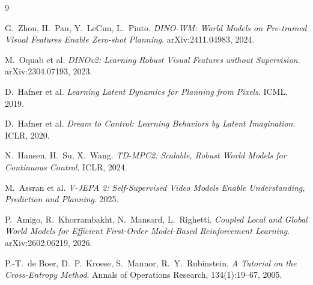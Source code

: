 \documentclass[11pt,a4paper]{article}
\begin{document}
\begin{thebibliography}{9}
\setlength{\itemsep}{2pt}

G.~Zhou, H.~Pan, Y.~LeCun, L.~Pinto.
\emph{DINO-WM: World Models on Pre-trained Visual Features Enable Zero-shot
Planning}. arXiv:2411.04983, 2024.

M.~Oquab et al.
\emph{DINOv2: Learning Robust Visual Features without Supervision}.
arXiv:2304.07193, 2023.

D.~Hafner et al.
\emph{Learning Latent Dynamics for Planning from Pixels}. ICML, 2019.

D.~Hafner et al.
\emph{Dream to Control: Learning Behaviors by Latent Imagination}. ICLR, 2020.

N.~Hansen, H.~Su, X.~Wang.
\emph{TD-MPC2: Scalable, Robust World Models for Continuous Control}.
ICLR, 2024.

M.~Assran et al.
\emph{V-JEPA 2: Self-Supervised Video Models Enable Understanding, Prediction
and Planning}. 2025.

P.~Amigo, R.~Khorrambakht, N.~Mansard, L.~Righetti.
\emph{Coupled Local and Global World Models for Efficient First-Order
Model-Based Reinforcement Learning}. arXiv:2602.06219, 2026.

P.-T.~de Boer, D.~P.~Kroese, S.~Mannor, R.~Y.~Rubinstein.
\emph{A Tutorial on the Cross-Entropy Method}. Annals of Operations Research,
134(1):19--67, 2005.

\end{thebibliography}
\end{document}
